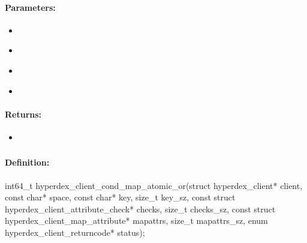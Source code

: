 \paragraph{Parameters:}
\begin{itemize}[noitemsep]
\item {}\\

\item {}\\

\item {}\\

\item {}\\

\end{itemize}

\paragraph{Returns:}
\begin{itemize}[noitemsep]
\item {}\\

\end{itemize}

\pagebreak
\subsubsection{}
\label{api:c:cond_map_atomic_or}


\paragraph{Definition:}
\begin{ccode}
int64_t hyperdex_client_cond_map_atomic_or(struct hyperdex_client* client,
        const char* space,
        const char* key, size_t key_sz,
        const struct hyperdex_client_attribute_check* checks, size_t checks_sz,
        const struct hyperdex_client_map_attribute* mapattrs, size_t mapattrs_sz,
        enum hyperdex_client_returncode* status);
\end{ccode}

